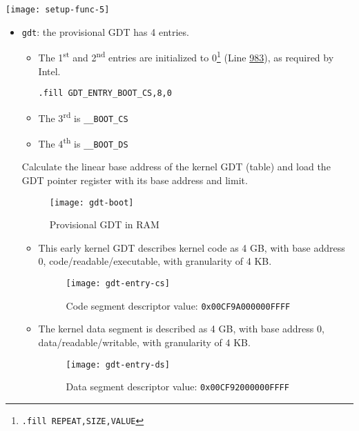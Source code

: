 \begin{enumerate}
  \begin{center}
    \texttt{[image: setup-func-5]}
  \end{center}

  \begin{itemize}
  \item \texttt{gdt}: the provisional GDT has 4 entries.
    \begin{itemize}
    \item The 1\textsuperscript{st} and 2\textsuperscript{nd} entries are initialized to
      0\footnote{\texttt{.fill REPEAT,SIZE,VALUE}}
      (Line \href{http://lxr.linux.no/linux+v2.6.11/arch/i386/boot/setup.S\#L983}{983}), as
      required by Intel.
      \begin{center}
        \texttt{.fill GDT_ENTRY_BOOT_CS,8,0}
      \end{center}
    \item The 3\textsuperscript{rd} is \texttt{\_\_BOOT\_CS}
    \item The 4\textsuperscript{th} is \texttt{\_\_BOOT\_DS}
    \end{itemize}
    Calculate the linear base address of the kernel GDT (table) and load the GDT pointer
    register with its base address and limit. 
    \begin{figure}[h]
      \centering
      \texttt{[image: gdt-boot]}
      \caption{Provisional GDT in RAM}
      \label{fig:gdt-boot}
    \end{figure}
    \begin{itemize}
    \item This early kernel GDT describes kernel code as 4 GB, with base address 0,
      code/readable/executable, with granularity of 4 KB.
      \begin{figure}[h]
        \centering
        \texttt{[image: gdt-entry-cs]}
        \caption{Code segment descriptor value: \texttt{0x00CF9A000000FFFF}}
        \label{fig:cs}
      \end{figure}
    \item The kernel data segment is described as 4 GB, with base address 0,
      data/readable/writable, with granularity of 4 KB.
      \begin{figure}[h]
        \centering
        \texttt{[image: gdt-entry-ds]}
        \caption{Data segment descriptor value: \texttt{0x00CF92000000FFFF}}
        \label{fig:ds}
      \end{figure}

\end{itemize}
\end{itemize}
\end{enumerate}
